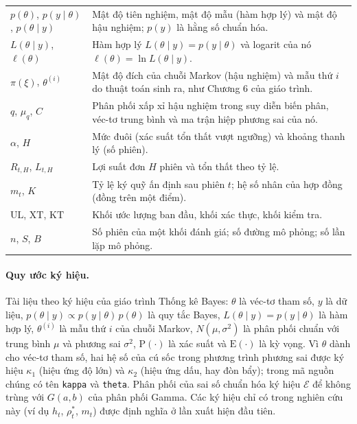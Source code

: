 \documentclass[12pt,a4paper]{article}
\theoremstyle{definition}
\theoremstyle{remark}
\newcommand{\Ecal}{\mathcal{E}}
\newcommand{\UL}{\mathrm{UL}}
\newcommand{\XT}{\mathrm{XT}}
\newcommand{\KT}{\mathrm{KT}}
\begin{document}
\begin{longtable}{@{}p{3.4cm}p{11.4cm}@{}}
$p(\theta)$, $p(y\mid\theta)$, $p(\theta\mid y)$ & Mật độ tiên nghiệm, mật độ mẫu (hàm hợp lý) và mật độ hậu nghiệm; $p(y)$ là hằng số chuẩn hóa. \\
$L(\theta\mid y)$, $\ell(\theta)$ & Hàm hợp lý $L(\theta\mid y)=p(y\mid\theta)$ và logarit của nó $\ell(\theta)=\ln L(\theta\mid y)$. \\
$\pi(\xi)$, $\theta^{(i)}$ & Mật độ đích của chuỗi Markov (hậu nghiệm) và mẫu thứ $i$ do thuật toán sinh ra, như Chương 6 của giáo trình. \\
$q$, $\mu_q$, $C$ & Phân phối xấp xỉ hậu nghiệm trong suy diễn biến phân, véc-tơ trung bình và ma trận hiệp phương sai của nó. \\
$\alpha$, $H$ & Mức đuôi (xác suất tổn thất vượt ngưỡng) và khoảng thanh lý (số phiên). \\
$R_{t,H}$, $L_{t,H}$ & Lợi suất đơn $H$ phiên và tổn thất theo tỷ lệ. \\
$m_t$, $K$ & Tỷ lệ ký quỹ ấn định sau phiên $t$; hệ số nhân của hợp đồng (đồng trên một điểm). \\
$\UL$, $\XT$, $\KT$ & Khối ước lượng ban đầu, khối xác thực, khối kiểm tra. \\
$n$, $S$, $B$ & Số phiên của một khối đánh giá; số đường mô phỏng; số lần lặp mô phỏng. \\
\end{longtable}

\paragraph{Quy ước ký hiệu.} Tài liệu theo ký hiệu của giáo trình Thống kê Bayes: $\theta$ là véc-tơ tham số, $y$ là dữ liệu, $p(\theta\mid y)\propto p(y\mid\theta)\,p(\theta)$ là quy tắc Bayes, $L(\theta\mid y)=p(y\mid\theta)$ là hàm hợp lý, $\theta^{(i)}$ là mẫu thứ $i$ của chuỗi Markov, $N(\mu,\sigma^2)$ là phân phối chuẩn với trung bình $\mu$ và phương sai $\sigma^2$, $\mathrm{P}(\cdot)$ là xác suất và $\mathrm{E}(\cdot)$ là kỳ vọng. Vì $\theta$ dành cho véc-tơ tham số, hai hệ số của cú sốc trong phương trình phương sai được ký hiệu $\kappa_1$ (hiệu ứng độ lớn) và $\kappa_2$ (hiệu ứng dấu, hay đòn bẩy); trong mã nguồn chúng có tên \texttt{kappa} và \texttt{theta}. Phân phối của sai số chuẩn hóa ký hiệu $\Ecal$ để không trùng với $G(a,b)$ của phân phối Gamma. Các ký hiệu chỉ có trong nghiên cứu này (ví dụ $h_t$, $\rho^{*}_t$, $m_t$) được định nghĩa ở lần xuất hiện đầu tiên.

\end{document}

